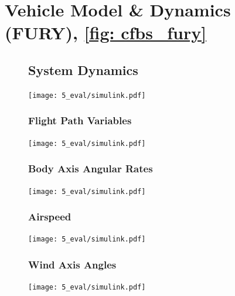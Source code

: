 \documentclass[12pt]{ucthesis}
\begin{document}
\section{Vehicle Model \& Dynamics (FURY), \autoref{fig: cfbs_fury}}
\label{sec: app_FURY}

	\begin{figure}
	\subsection{System Dynamics}
	\label{subsec: app_FURY_eom}
			\centering
			\texttt{[image: 5\_eval/simulink.pdf]}%
		\label{fig: cfbs_FURY_eom}
	\end{figure}

	\begin{figure}
	\subsubsection{Flight Path Variables}
	\label{subsubsec: app_FURY_eom1}
			\texttt{[image: 5\_eval/simulink.pdf]}%
		\label{fig: cfbs_FURY_eom1}

	\subsubsection{Body Axis Angular Rates} 
	\label{subsubsec: app_FURY_eom4}
			\texttt{[image: 5\_eval/simulink.pdf]}%
		\label{fig: cfbs_FURY_eom4}
	\end{figure}
	
	\begin{figure}
	\subsubsection{Airspeed}
	\label{subsubsec: app_FURY_eom2}
				\texttt{[image: 5\_eval/simulink.pdf]}%
			\label{fig: cfbs_FURY_eom2}
	
	\subsubsection{Wind Axis Angles} \label{subsubsec: app_FURY_eom3}%
			\texttt{[image: 5\_eval/simulink.pdf]}%
		\label{fig: cfbs_FURY_eom3}%
	\end{figure}
	
\end{document}
